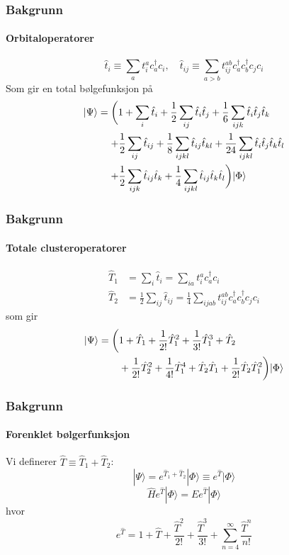 \documentclass[norsk,a4paper,12pt]{beamer}
\begin{document}
  \begin{frame}
    \frametitle{Bakgrunn}
    \framesubtitle{Orbitaloperatorer}
    \begin{equation}
    \hat{t}_i\equiv \sum_a t_i^a c_a^{\dagger}c_i,\quad \hat{t}_{ij}\equiv\sum_{a>b}t_{ij}^{ab}c_a^{\dagger}c_b^{\dagger}c_jc_i
    \end{equation}
    Som gir en total bølgefunksjon på 
    \begin{align}
    |\Psi\rangle&=\bigg(1+\sum_i\hat{t}_i+\frac{1}{2}\sum_{ij}\hat{t}_i\hat{t}_j+\frac{1}{6}\sum_{ijk}\hat{t}_i\hat{t}_j\hat{t}_k\notag\\
    &\mathrel{\phantom{=}}+\frac{1}{2}\sum_{ij}\hat{t}_{ij}
    +\frac{1}{8}\sum_{ijkl}\hat{t}_{ij}\hat{t}_{kl}+\frac{1}{24}\sum_{ijkl}\hat{t}_i\hat{t}_j\hat{t}_k\hat{t}_l\\
    &\mathrel{\phantom{=}}+\frac{1}{2}\sum_{ijk}\hat{t}_{ij}\hat{t}_k+\frac{1}{4}\sum_{ijkl}\hat{t}_{ij}\hat{t}_k\hat{t}_l\bigg)|\Phi\rangle\notag
    \end{align}
  \end{frame}
  
  \begin{frame}
    \frametitle{Bakgrunn}
    \framesubtitle{Totale clusteroperatorer}
    \begin{align}
    \hat{T}_1&=\sum_i\hat{t}_i=\sum_{ia}t_i^ac_a^{\dagger}c_i\\
    \hat{T}_2&=\frac{1}{2}\sum_{ij}\hat{t}_{ij}=\frac{1}{4}\sum_{ijab}t_{ij}^{ab}c_a^{\dagger}c_b^{\dagger}c_jc_i
    \end{align}
    som gir
    \begin{align}
    |\Psi\rangle=\bigg(&1+\hat{T}_1+\frac{1}{2!}\hat{T}_1^2+\frac{1}{3!}\hat{T}_1^3+\hat{T}_2\notag\\
    &+\frac{1}{2!}\hat{T}_2^2+\frac{1}{4!}\hat{T}_1^4+\hat{T}_2\hat{T}_1+\frac{1}{2!}\hat{T}_2\hat{T}_1^2\bigg)|\Phi\rangle
    \end{align}
  \end{frame}
  
  \begin{frame}
    \frametitle{Bakgrunn}
    \framesubtitle{Forenklet bølgerfunksjon}
    Vi definerer $\hat{T}\equiv\hat{T}_1+\hat{T}_2$:
    \begin{equation}
    |\Psi\rangle=e^{\hat{T}_1+\hat{T}_2}|\Phi\rangle\equiv e^{\hat{T}}|\Phi\rangle
    \end{equation}
    \begin{equation}
    \hat{H}e^{\hat{T}}|\Phi\rangle=Ee^{\hat{T}}|\Phi\rangle
    \end{equation}
    hvor
    \begin{equation}
    e^{\hat{T}}=1+\hat{T}+\frac{\hat{T}^2}{2!}+\frac{\hat{T}^3}{3!}+\sum_{n=4}^{\infty}\frac{\hat{T}^n}{n!}
    \end{equation}
  \end{frame}
  
\end{document}
